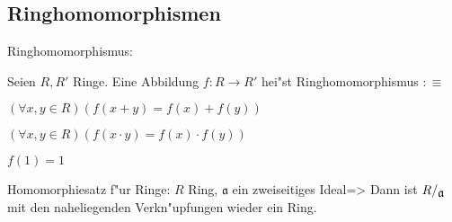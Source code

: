 \subsection{Ringhomomorphismen}
 Ringhomomorphismus:{
  Seien $R,R'$ Ringe.
  Eine Abbildung $f:R\to R'$ hei"st Ringhomomorphismus $:\equiv$
  \begin{stmts}
    \item $(\forall x,y\in R)(f(x+y)=f(x)+f(y))$
    \item $(\forall x,y\in R)(f(x\cdot y)=f(x)\cdot f(y))$
    \item $f(1)=1$
    \end{stmts}
  }
\theorem Homomorphiesatz f"ur Ringe:
  $R$ Ring, $\mathfrak a$ ein zweiseitiges Ideal=>{
  Dann ist $\rcoset R {\mathfrak a}$ mit den naheliegenden Verkn"upfungen
  wieder ein Ring. 
  }
